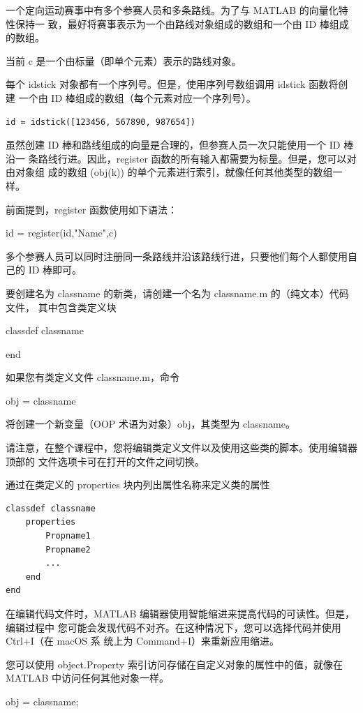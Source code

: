 \documentclass[12pt,a4paper]{article}
\begin{document}
一个定向运动赛事中有多个参赛人员和多条路线。为了与 MATLAB 的向量化特性保持一
致，最好将赛事表示为一个由路线对象组成的数组和一个由 ID 棒组成的数组。

当前 c 是一个由标量（即单个元素）表示的路线对象。

每个 idstick 对象都有一个序列号。但是，使用序列号数组调用 idstick 函数将创建
一个由 ID 棒组成的数组（每个元素对应一个序列号）。

\begin{lstlisting}
id = idstick([123456, 567890, 987654])
\end{lstlisting}

虽然创建 ID 棒和路线组成的向量是合理的，但参赛人员一次只能使用一个 ID 棒沿一
条路线行进。因此，register 函数的所有输入都需要为标量。但是，您可以对由对象组
成的数组 (obj(k)) 的单个元素进行索引，就像任何其他类型的数组一样。

前面提到，register 函数使用如下语法：

id = register(id,"Name",c)

多个参赛人员可以同时注册同一条路线并沿该路线行进，只要他们每个人都使用自己的 
ID 棒即可。

要创建名为 classname 的新类，请创建一个名为 classname.m 的（纯文本）代码文件，
其中包含类定义块

classdef classname

end

如果您有类定义文件 classname.m，命令

obj = classname

将创建一个新变量（OOP 术语为对象）obj，其类型为 classname。

请注意，在整个课程中，您将编辑类定义文件以及使用这些类的脚本。使用编辑器顶部的
文件选项卡可在打开的文件之间切换。

通过在类定义的 properties 块内列出属性名称来定义类的属性

\begin{lstlisting}
classdef classname
    properties
        Propname1
        Propname2
        ...
    end
end
\end{lstlisting}

在编辑代码文件时，MATLAB 编辑器使用智能缩进来提高代码的可读性。但是，编辑过程中
您可能会发现代码不对齐。在这种情况下，您可以选择代码并使用 Ctrl+I（在 macOS 系
统上为 Command+I）来重新应用缩进。

您可以使用 object.Property 索引访问存储在自定义对象的属性中的值，就像在 MATLAB
中访问任何其他对象一样。

obj = classname;
\end{document}
